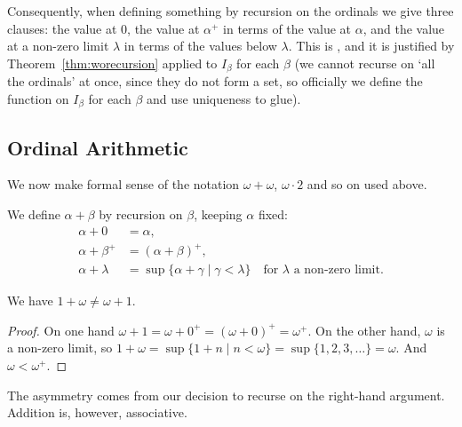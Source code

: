 \documentclass[a4paper]{scrartcl}
\begin{document}
Consequently, when defining something by recursion on the ordinals we give three clauses: the value at $0$, the value at $\alpha^+$ in terms of the value at $\alpha$, and the value at a non-zero limit $\lambda$ in terms of the values below $\lambda$. This is , and it is justified by Theorem~\ref{thm:worecursion} applied to $I_\beta$ for each $\beta$ (we cannot recurse on `all the ordinals' at once, since they do not form a set, so officially we define the function on $I_\beta$ for each $\beta$ and use uniqueness to glue).

\subsection{Ordinal Arithmetic}\label{sec:ordarith}

We now make formal sense of the notation $\omega + \omega$, $\omega \cdot 2$ and so on used above.

\begin{definition}
We define $\alpha + \beta$ by recursion on $\beta$, keeping $\alpha$ fixed:
\begin{align*}
  \alpha + 0 &= \alpha,\\
  \alpha + \beta^+ &= (\alpha + \beta)^+,\\
  \alpha + \lambda &= \sup\{\alpha + \gamma \mid \gamma < \lambda\} \quad \text{for } \lambda \text{ a non-zero limit.}
\end{align*}
\end{definition}

\begin{proposition}
  We have $1 + \omega \neq \omega + 1$.
\end{proposition}
\begin{proof}
  On one hand $\omega + 1 = \omega + 0^+ = (\omega + 0)^+ = \omega^+$. On the other hand, $\omega$ is a non-zero limit, so $1 + \omega = \sup\{1 + n \mid n < \omega\} = \sup\{1, 2, 3, \dots\} = \omega$. And $\omega < \omega^+$.
\end{proof}

The asymmetry comes from our decision to recurse on the right-hand argument. Addition is, however, associative.
\end{document}
